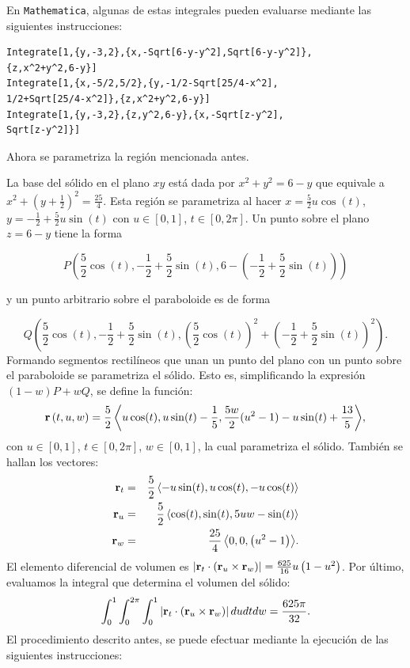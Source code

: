En \verb"Mathematica", algunas de estas integrales pueden evaluarse mediante las siguientes instrucciones:

\begin{tcolorbox}[title=\bf Instrucción en \verb"Mathematica"]\begin{Verbatim}[formatcom=\letraverbatim]
Integrate[1,{y,-3,2},{x,-Sqrt[6-y-y^2],Sqrt[6-y-y^2]},
{z,x^2+y^2,6-y}]
Integrate[1,{x,-5/2,5/2},{y,-1/2-Sqrt[25/4-x^2],
1/2+Sqrt[25/4-x^2]},{z,x^2+y^2,6-y}]
Integrate[1,{y,-3,2},{z,y^2,6-y},{x,-Sqrt[z-y^2],
Sqrt[z-y^2]}]
\end{Verbatim}
\end{tcolorbox}

Ahora se parametriza la región mencionada antes.

La base del sólido en el plano $xy$ está dada por
$x^2+y^2=6-y$ que equivale a $x^2+\left( y+\frac{1}{2}\right)^2=\frac{25}{4}$.
Esta región se parametriza al hacer $x=\frac{5}{2}u\cos(t)$, $y=-\frac{1}{2}+\frac{5}{2}u\sin(t)$
con $u\in [0,1]$, $t\in [0,2\pi]$. Un punto sobre el plano $z=6-y$ tiene la forma

\[P\left(\frac{5}{2}\cos(t),-\frac{1}{2}+\frac{5}{2}\sin(t),6-(-\frac{1}{2}+\frac{5}{2}\sin(t))\right)\]

y un punto arbitrario sobre el paraboloide es de  forma

\[Q\left(\frac{5}{2}\cos(t),-\frac{1}{2}+\frac{5}{2}\sin(t),(\frac{5}{2}\cos(t))^2+(-\frac{1}{2}+\frac{5}{2}\sin(t))^2\right)\!.\]
Formando segmentos rectilíneos que unan un punto del plano con un punto sobre el paraboloide se parametriza el sólido. Esto es, simplificando la expresión $(1-w)P+wQ$, se define la función:
%
\[{\bf r}\left(t,u,w\right)=\frac{5}{2} \left\langle u \cos (t),u\sin(t)-\frac{1}{5},\frac{5w}{2}(u^2-1)-u\sin(t)+\frac{13}{5} \right\rangle\!,\]
%
con $u\in [0,1]$, $t\in [0,2\pi]$, $w\in [0,1]$,
la cual parametriza el sólido. También se hallan los vectores:
{\small
\begin{eqnarray*}
{\bf r}_{t} &=& \frac{5}{2}\left\langle - u \sin (t), u \cos (t),- u \cos (t) \right\rangle \\
{\bf r}_{u} &=& \frac{5}{2}\left\langle \cos (t), \sin (t),5 u w-\sin (t)\right\rangle \\
{\bf r}_{w} &=& \frac{25}{4}\left\langle 0,0, \left(u^2-1\right) \right\rangle\!.
\end{eqnarray*}
}
%
El elemento diferencial de volumen es
$\left|{\bf r}_{t}\cdot\left({\bf r}_{u}\times {\bf r}_{w}\right)\right| =\frac{625}{16} u \left(1-u^2\right)$.
Por último, evaluamos la integral que determina el volumen del sólido:
\[ \int_{0}^{1}\int_{0}^{2\pi}\int_{0}^{1} \left|{\bf r}_{t}\cdot\left({\bf r}_{u}\times {\bf r}_{w}\right)\right|dudtdw=\frac{625\pi}{32}.\]
%
El procedimiento descrito antes, se puede efectuar mediante la ejecución de las siguientes instrucciones: %


